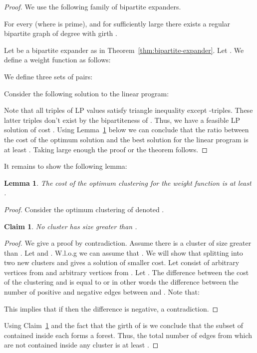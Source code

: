 \documentclass[11pt]{article}
\newtheorem{lemma}[theorem]{Lemma}
\newtheorem{claim}[theorem]{Claim}
\theoremstyle{definition}
\theoremstyle{remark}
\begin{document}
\begin{proof}
We use the following family of bipartite expanders.
\begin{theorem}\label{thm:bipartite-expander}
For every  (where  is prime), and for sufficiently large  there exists a regular bipartite graph of
degree  with girth .
\end{theorem}

Let  be a bipartite expander as in
Theorem~\ref{thm:bipartite-expander}.  Let .  We define a
weight function  as follows:

We define three sets of pairs:

Consider the following solution to the linear program:

Note that all triples of LP values satisfy triangle inequality except -triples.
These latter triples don't exist by the bipartiteness of .
Thus, we have a feasible LP solution of cost .
Using Lemma~\ref{lem:clustering-cost-bipartite} below we can conclude that the ratio between the cost of the optimum solution and the best solution for the linear program is at least . Taking large enough  the proof or the theorem follows.
\end{proof}
It remains to show the following lemma:
\begin{lemma}\label{lem:clustering-cost-bipartite}
The cost of the optimum clustering for the weight function  is at least .
\end{lemma}
\begin{proof}
Consider the optimum clustering of  denoted .
\begin{claim}\label{clm:cluster-size}
No cluster  has size greater than .
\end{claim}
\begin{proof}
We give a proof by contradiction.
Assume there is a cluster  of size greater than .
Let  and . W.l.o.g we can assume that .
We will show that splitting  into two new clusters  and  gives a solution of smaller cost.
Let  consist of  arbitrary vertices from  and  arbitrary vertices from . Let . The difference between the cost of the clustering  and  is equal to  or in other words the difference between the number of positive and negative edges between  and .
Note that:

This implies that if  then the difference is negative, a contradiction.
\end{proof}
Using Claim~\ref{clm:cluster-size} and the fact that the girth of  is  we conclude that the subset of  contained inside each  forms a forest.
Thus, the total number of edges from  which are not contained inside any cluster is at least .
\end{proof}
\end{document}
